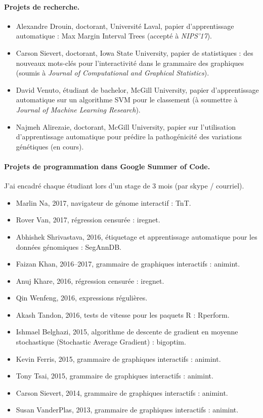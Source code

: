 \documentclass{article}
\begin{document}
\paragraph{Projets de recherche.}
\begin{itemize}
\item Alexandre Drouin, doctorant, Universit\'e Laval, papier
  d'apprentissage automatique : Max Margin Interval Trees (accepté à
  \emph{NIPS'17}).
\item Carson Sievert, doctorant, Iowa State University, papier de
  statistiques : des nouveaux mots-clés pour l'interactivité dans le
  grammaire des graphiques (soumis à \emph{Journal of Computational
    and Graphical Statistics}).
\item David Venuto, étudiant de bachelor, McGill University, papier
  d'apprentissage automatique sur un algorithme SVM pour le classement
  (à soumettre à \emph{Journal of Machine Learning Research}).
\item Najmeh Alirezaie, doctorant, McGill University, papier sur
  l'utilisation d'apprentissage automatique pour prédire la pathogénicité des
  variations génétiques (en cours).
\end{itemize}

\paragraph{Projets de programmation dans Google Summer of Code.} J'ai
encadré chaque étudiant lors d'un stage de 3 mois (par skype / courriel).
\begin{itemize}
\item Marlin Na, 2017, navigateur de génome interactif : TnT.
\item Rover Van, 2017, régression censurée : iregnet.
\item Abhishek Shrivastava, 2016, étiquetage et apprentissage automatique pour les données génomiques : SegAnnDB.
\item Faizan Khan, 2016--2017, grammaire de graphiques interactifs : animint.
\item Anuj Khare, 2016, régression censurée : iregnet.
\item Qin Wenfeng, 2016, expressions régulières.
\item Akash Tandon, 2016, tests de vitesse pour les paquets R : Rperform.
\item Ishmael Belghazi, 2015, algorithme de descente de gradient en moyenne
  stochastique  (Stochastic Average Gradient) : bigoptim.
\item Kevin Ferris, 2015, grammaire de graphiques interactifs : animint.
\item Tony Tsai, 2015, grammaire de graphiques interactifs : animint.
\item Carson Sievert, 2014, grammaire de graphiques interactifs : animint.
\item Susan VanderPlas, 2013, grammaire de graphiques interactifs : animint.
\end{itemize}
\end{document}
